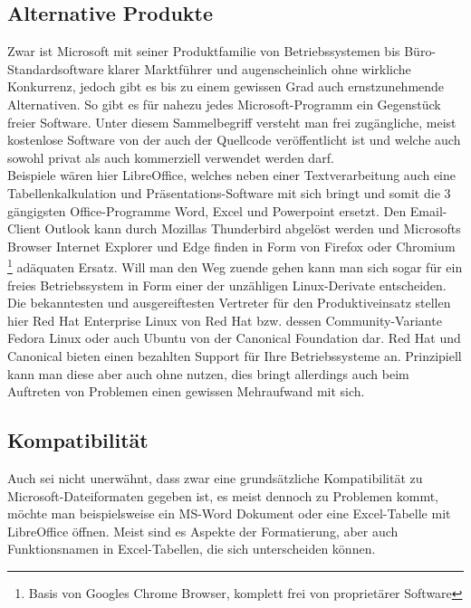 \subsection{Alternative Produkte}
Zwar ist Microsoft mit seiner Produktfamilie von Betriebssystemen bis Büro-Standardsoftware klarer Marktführer und augenscheinlich ohne wirkliche Konkurrenz, jedoch gibt es bis zu einem gewissen Grad auch ernstzunehmende Alternativen. So gibt es für nahezu jedes Microsoft-Programm ein Gegenstück freier Software. Unter diesem Sammelbegriff versteht man frei zugängliche, meist kostenlose Software von der auch der Quellcode veröffentlicht ist und welche auch sowohl privat als auch kommerziell verwendet werden darf.\\
Beispiele wären hier \glqq LibreOffice\grqq{}, welches neben einer Textverarbeitung auch eine Tabellenkalkulation und Präsentations-Software mit sich bringt und somit die 3 gängigsten Office-Programme \glqq Word\grqq{}, \glqq Excel\grqq{} und \glqq Powerpoint \grqq{} ersetzt. Den Email-Client \glqq Outlook\grqq{} kann durch Mozillas \glqq Thunderbird\grqq{} abgelöst werden und Microsofts Browser \glqq Internet Explorer\grqq{} und \glqq Edge\grqq{} finden in Form von \glqq Firefox\grqq{} oder \glqq Chromium\grqq{} \footnote{Basis von Googles Chrome Browser, komplett frei von proprietärer Software} adäquaten Ersatz. Will man den Weg zuende gehen kann man sich sogar für ein freies Betriebssystem in Form einer der unzähligen Linux-Derivate entscheiden. Die bekanntesten und ausgereiftesten Vertreter für den Produktiveinsatz stellen hier \glqq Red Hat Enterprise Linux\grqq{} von Red Hat bzw. dessen Community-Variante \glqq Fedora Linux\grqq{} oder auch \glqq Ubuntu\grqq{} von der Canonical Foundation dar. Red Hat und Canonical bieten einen bezahlten Support für Ihre Betriebssysteme an. Prinzipiell kann man diese aber auch ohne nutzen, dies bringt allerdings auch beim Auftreten von Problemen einen gewissen Mehraufwand mit sich.

\subsection{Kompatibilität}
Auch sei nicht unerwähnt, dass zwar eine grundsätzliche Kompatibilität zu Microsoft-Dateiformaten gegeben ist, es meist dennoch zu Problemen kommt, möchte man beispielsweise ein MS-Word Dokument oder eine Excel-Tabelle mit LibreOffice öffnen. Meist sind es Aspekte der Formatierung, aber auch Funktionsnamen in Excel-Tabellen, die sich unterscheiden können.